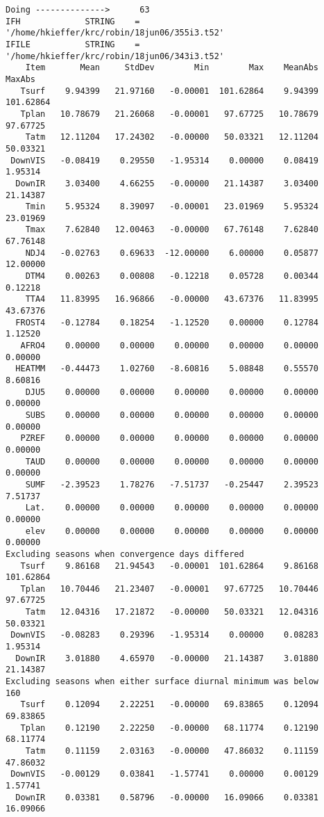 \documentclass{article}
\begin{document}
\begin{verbatim}
Doing -------------->      63
IFH             STRING    = '/home/hkieffer/krc/robin/18jun06/355i3.t52'
IFILE           STRING    = '/home/hkieffer/krc/robin/18jun06/343i3.t52'
    Item       Mean     StdDev        Min        Max    MeanAbs     MaxAbs
   Tsurf    9.94399   21.97160   -0.00001  101.62864    9.94399  101.62864
   Tplan   10.78679   21.26068   -0.00001   97.67725   10.78679   97.67725
    Tatm   12.11204   17.24302   -0.00000   50.03321   12.11204   50.03321
 DownVIS   -0.08419    0.29550   -1.95314    0.00000    0.08419    1.95314
  DownIR    3.03400    4.66255   -0.00000   21.14387    3.03400   21.14387
    Tmin    5.95324    8.39097   -0.00001   23.01969    5.95324   23.01969
    Tmax    7.62840   12.00463   -0.00000   67.76148    7.62840   67.76148
    NDJ4   -0.02763    0.69633  -12.00000    6.00000    0.05877   12.00000
    DTM4    0.00263    0.00808   -0.12218    0.05728    0.00344    0.12218
    TTA4   11.83995   16.96866   -0.00000   43.67376   11.83995   43.67376
  FROST4   -0.12784    0.18254   -1.12520    0.00000    0.12784    1.12520
   AFRO4    0.00000    0.00000    0.00000    0.00000    0.00000    0.00000
  HEATMM   -0.44473    1.02760   -8.60816    5.08848    0.55570    8.60816
    DJU5    0.00000    0.00000    0.00000    0.00000    0.00000    0.00000
    SUBS    0.00000    0.00000    0.00000    0.00000    0.00000    0.00000
   PZREF    0.00000    0.00000    0.00000    0.00000    0.00000    0.00000
    TAUD    0.00000    0.00000    0.00000    0.00000    0.00000    0.00000
    SUMF   -2.39523    1.78276   -7.51737   -0.25447    2.39523    7.51737
    Lat.    0.00000    0.00000    0.00000    0.00000    0.00000    0.00000
    elev    0.00000    0.00000    0.00000    0.00000    0.00000    0.00000
Excluding seasons when convergence days differed
   Tsurf    9.86168   21.94543   -0.00001  101.62864    9.86168  101.62864
   Tplan   10.70446   21.23407   -0.00001   97.67725   10.70446   97.67725
    Tatm   12.04316   17.21872   -0.00000   50.03321   12.04316   50.03321
 DownVIS   -0.08283    0.29396   -1.95314    0.00000    0.08283    1.95314
  DownIR    3.01880    4.65970   -0.00000   21.14387    3.01880   21.14387
Excluding seasons when either surface diurnal minimum was below     160
   Tsurf    0.12094    2.22251   -0.00000   69.83865    0.12094   69.83865
   Tplan    0.12190    2.22250   -0.00000   68.11774    0.12190   68.11774
    Tatm    0.11159    2.03163   -0.00000   47.86032    0.11159   47.86032
 DownVIS   -0.00129    0.03841   -1.57741    0.00000    0.00129    1.57741
  DownIR    0.03381    0.58796   -0.00000   16.09066    0.03381   16.09066
\end{verbatim}
\end{document}
